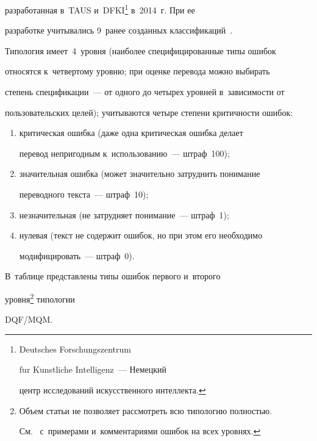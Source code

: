 разработанная в~TAUS и~DFKI\footnote[1]{Deutsches Forschungszentrum 

f$\ddot{\mbox{u}}$r K$\ddot{\mbox{u}}$nstliche Intelligenz~--- Немецкий 

центр исследований искусственного интеллекта.} в~2014~г. При ее 

разработке учитывались 9~ранее созданных классификаций~\cite{16-r}. 

Типология имеет~4~уровня (наиболее специфицированные типы ошибок 

относятся к~четвертому уровню; при оценке перевода можно выбирать 

степень спецификации~--- от одного до четырех уровней в~зависимости от 

пользовательских целей); учитываются четыре степени критичности ошибок:

  \begin{enumerate}[(1)]

  \item критическая ошибка (даже одна критическая ошибка делает 

перевод непригодным к~использованию~--- штраф~100);\\[-14.5pt]

  \item значительная ошибка (может значительно затруднить понимание 

переводного текста~--- штраф~10);\\[-14.5pt]

  \item незначительная (не затрудняет понимание~--- штраф~1);\\[-14.5pt]

  \item нулевая (текст не содержит ошибок, но при этом его необходимо 

модифицировать~--- штраф~0).

  \end{enumerate}

  

  В~таблице представлены типы ошибок первого и~второго 

уровня\footnote[1]{Объем статьи не позволяет рассмотреть всю типологию полностью.  

См.~\cite{18-r} с~примерами и~комментариями ошибок на всех уровнях.} типологии 

DQF\!/\!MQM.

  



  



